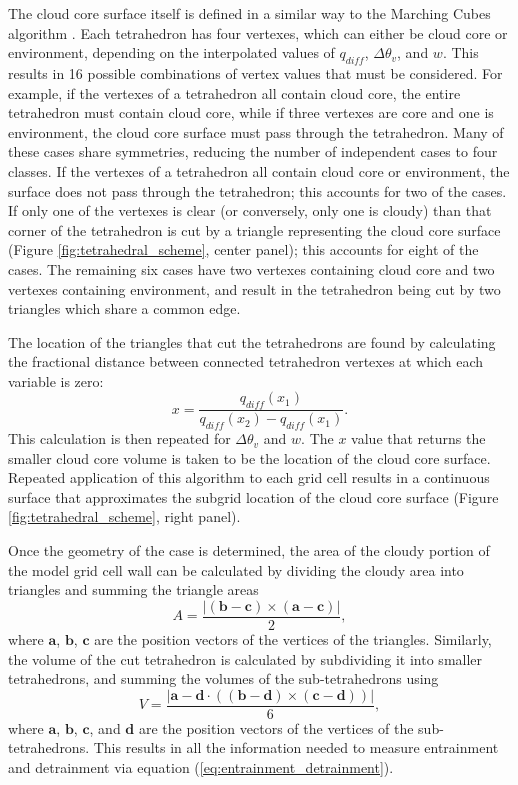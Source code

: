 \documentclass[12pt]{article}
\begin{document}
The cloud core surface itself is defined in a similar way to the Marching 
Cubes algorithm \citep{Lorensen1987}.  Each tetrahedron has four vertexes, 
which can either be cloud core or environment, depending on the interpolated 
values of $q_{diff}$, $\Delta \theta_v$, and $w$.  This results in 16 
possible combinations of vertex values that must be considered.  For example,
if the vertexes of a tetrahedron all contain cloud core, the entire 
tetrahedron must contain cloud core, while if three vertexes are core and one 
is environment, the cloud core surface must pass through the tetrahedron.
Many of these cases share symmetries, reducing the number of independent cases 
to four classes.  If the vertexes of a tetrahedron all contain cloud core or 
environment, the surface does not pass through the tetrahedron; this accounts 
for two of the cases.  If only one of the vertexes is clear (or conversely, 
only one is cloudy) than that corner of the tetrahedron is cut by a triangle 
representing the cloud core surface (Figure \ref{fig:tetrahedral_scheme}, 
center panel); this accounts for eight of the cases.  The remaining six cases 
have two vertexes containing cloud core and two vertexes containing 
environment, and result in the tetrahedron being cut by two triangles which 
share a common edge.

The location of the triangles that cut the tetrahedrons are found by 
calculating the fractional distance between connected tetrahedron vertexes at 
which each variable is zero:
\begin{equation}
\label{eq:q_diff_interpolation}
x = \frac{q_{diff}(x_1)}{q_{diff}(x_2) - q_{diff}(x_1)}.
\end{equation}
This calculation is then repeated for $\Delta\theta_v$ and $w$.  The $x$ value 
that returns the smaller cloud core volume is taken to be the location of the 
cloud core surface.   Repeated application of this algorithm to each grid cell 
results in a continuous surface that approximates the subgrid location of the 
cloud core surface (Figure \ref{fig:tetrahedral_scheme}, right panel).

Once the geometry of the case is determined, the area of the cloudy portion of
the model grid cell wall can be calculated by dividing the cloudy area into 
triangles and summing the triangle areas
\begin{equation}
A = \frac{|(\mathbf{b - c}) \times (\mathbf{a - c})|}{2},
\end{equation}
where $\mathbf{a}$, $\mathbf{b}$, $\mathbf{c}$ are the position vectors of the 
vertices of the triangles.  Similarly, the volume of the cut tetrahedron is 
calculated by subdividing it into smaller tetrahedrons, and summing the volumes 
of the sub-tetrahedrons using
\begin{equation}
V = \frac{|\mathbf{a - d} \cdot ((\mathbf{b - d}) \times (\mathbf{c - d}))|}{6},
\end{equation}
where $\mathbf{a}$, $\mathbf{b}$, $\mathbf{c}$, and $\mathbf{d}$ are the 
position vectors of the vertices of the sub-tetrahedrons.  This results in 
all the information needed to measure entrainment and detrainment via equation
(\ref{eq:entrainment_detrainment}).
\end{document}
